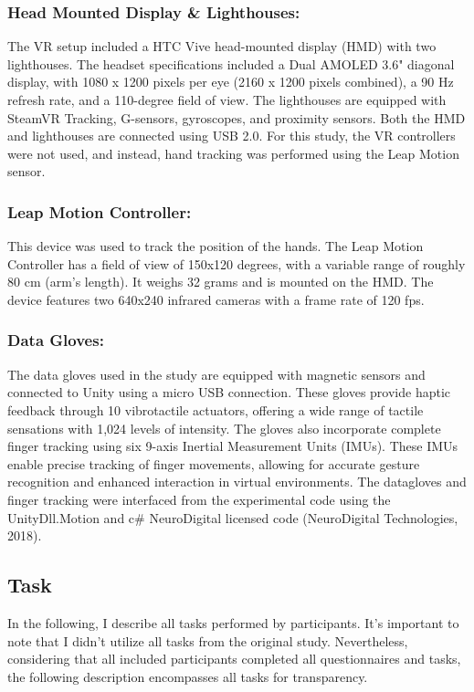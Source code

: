 \documentclass[12pt,oneside,openright]{report}
\begin{document}
\subsubsection*{Head Mounted Display \& Lighthouses:}
The VR setup included a HTC Vive head-mounted display (HMD) with two lighthouses. The headset specifications included a Dual AMOLED 3.6" diagonal display, with 1080 x 1200 pixels per eye (2160 x 1200 pixels combined), a 90 Hz refresh rate, and a 110-degree field of view. The lighthouses are equipped with SteamVR Tracking, G-sensors, gyroscopes, and proximity sensors. Both the HMD and lighthouses are connected using USB 2.0. For this study, the VR controllers were not used, and instead, hand tracking was performed using the Leap Motion sensor.

\subsubsection*{Leap Motion Controller:}
This device was used to track the position of the hands. The Leap Motion Controller has a field of view of 150x120 degrees, with a variable range of roughly 80 cm (arm's length). It weighs 32 grams and is mounted on the HMD. The device features two 640x240 infrared cameras with a frame rate of 120 fps.

\subsubsection*{Data Gloves:}
The data gloves used in the study are equipped with magnetic sensors and connected to Unity using a micro USB connection. These gloves provide haptic feedback through 10 vibrotactile actuators, offering a wide range of tactile sensations with 1,024 levels of intensity. The gloves also incorporate complete finger tracking using six 9-axis Inertial Measurement Units (IMUs). These IMUs enable precise tracking of finger movements, allowing for accurate gesture recognition and enhanced interaction in virtual environments. The datagloves and finger tracking were interfaced from the experimental code using the UnityDll.Motion and c\# NeuroDigital licensed code (NeuroDigital Technologies, 2018).


\subsection*{Task}

In the following, I describe all tasks performed by participants. It's important to note that I didn't utilize all tasks from the original study. Nevertheless, considering that all included participants completed all questionnaires and tasks, the following description encompasses all tasks for transparency.
\end{document}
